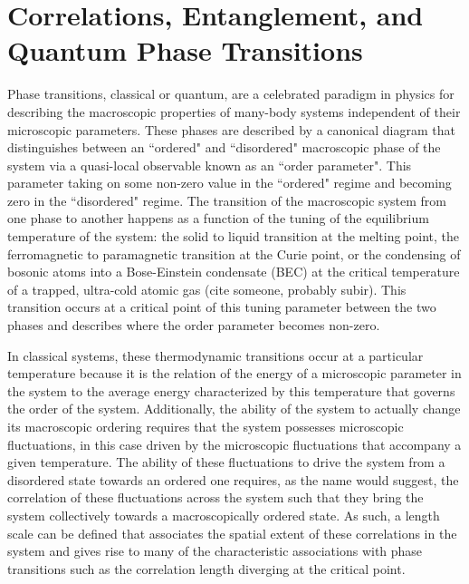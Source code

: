 
\chapter{Correlations, Entanglement, \newline and Quantum Phase Transitions}

Phase transitions, classical or quantum, are a celebrated paradigm in physics for describing the macroscopic properties of many-body systems independent of their microscopic parameters. These phases are described by a canonical diagram that distinguishes between an ``ordered" and ``disordered" macroscopic phase of the system via a quasi-local observable known as an ``order parameter". This parameter taking on some non-zero value in the ``ordered" regime and becoming zero in the ``disordered" regime. The transition of the macroscopic system from one phase to another happens as a function of the tuning of the equilibrium temperature of the system: the solid to liquid transition at the melting point, the ferromagnetic to paramagnetic transition at the Curie point, or the condensing of bosonic atoms into a Bose-Einstein condensate (BEC) at the critical temperature of a trapped, ultra-cold atomic gas (cite someone, probably subir). This transition occurs at a critical point of this tuning parameter between the two phases and describes where the order parameter becomes non-zero.

In classical systems, these thermodynamic transitions occur at a particular temperature because it is the relation of the energy of a microscopic parameter in the system to the average energy characterized by this temperature that governs the order of the system. Additionally, the ability of the system to actually change its macroscopic ordering requires that the system possesses microscopic fluctuations, in this case driven by the microscopic fluctuations that accompany a given temperature. The ability of these fluctuations to drive the system from a disordered state towards an ordered one requires, as the name would suggest, the correlation of these fluctuations across the system such that they bring the system collectively towards a macroscopically ordered state. As such, a length scale can be defined that associates the spatial extent of these correlations in the system and gives rise to many of the characteristic associations with phase transitions such as the correlation length diverging at the critical point. 

